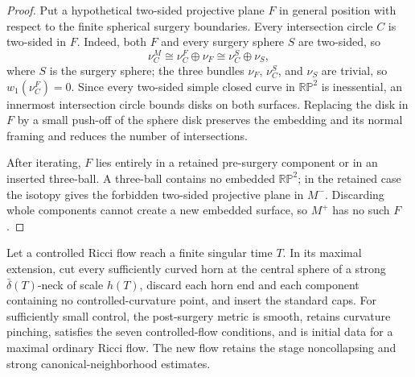 \begin{proof}
Put a hypothetical two-sided projective plane $F$ in general position with
respect to the finite spherical surgery boundaries.  Every intersection circle
$C$ is two-sided in $F$.  Indeed, both $F$ and every surgery sphere $S$ are
two-sided, so
\[
 \nu_C^M\cong\nu_C^F\oplus\nu_F\cong\nu_C^S\oplus\nu_S,
\]
where $S$ is the surgery sphere; the three bundles $\nu_F$, $\nu_C^S$, and
$\nu_S$ are trivial, so $w_1(\nu_C^F)=0$.  Since every two-sided simple
closed curve in $\mathbb{RP}^2$
is inessential, an innermost intersection circle bounds disks on both
surfaces.  Replacing the disk in $F$ by a small push-off of the sphere disk
preserves the embedding and its normal framing and reduces the number of
intersections.

After iterating, $F$ lies entirely in a retained pre-surgery component or in
an inserted three-ball.  A three-ball contains no embedded $\mathbb{RP}^2$;
in the retained case the isotopy gives the forbidden two-sided projective
plane in $M^-$.  Discarding whole components cannot create a new embedded
surface, so $M^+$ has no such $F$.
\end{proof}

\begin{lemma}
\label{lem:controlled-surgery-restart}
\notready
Let a controlled Ricci flow reach a finite singular time $T$.  In its maximal
extension, cut every sufficiently curved horn at the central sphere of a
strong $\bar\delta(T)$-neck of scale $h(T)$, discard each horn end and each
component containing no controlled-curvature point, and insert the standard
caps.  For sufficiently small control, the post-surgery metric is smooth,
retains curvature pinching, satisfies the seven controlled-flow conditions,
and is initial data for a maximal ordinary Ricci flow.  The new flow retains
the stage noncollapsing and strong canonical-neighborhood estimates.
\end{lemma}

